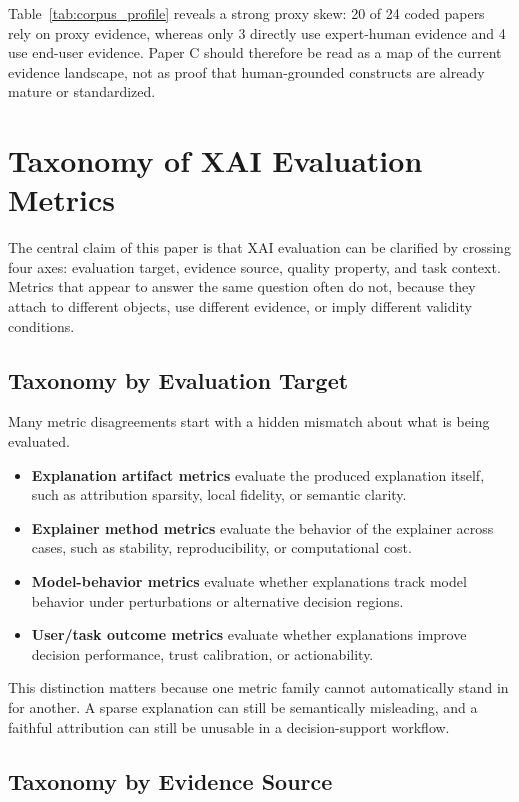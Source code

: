 \documentclass[twoside,11pt]{article}
\begin{document}
Table~\ref{tab:corpus_profile} reveals a strong proxy skew: 20 of 24
coded papers rely on proxy evidence, whereas only 3 directly use
expert-human evidence and 4 use end-user evidence. Paper C should
therefore be read as a map of the current evidence landscape, not as
proof that human-grounded constructs are already mature or standardized.

\section{Taxonomy of XAI Evaluation Metrics}

The central claim of this paper is that XAI evaluation can be clarified
by crossing four axes: evaluation target, evidence source, quality
property, and task context. Metrics that appear to answer the same
question often do not, because they attach to different objects, use
different evidence, or imply different validity conditions.

\subsection{Taxonomy by Evaluation Target}

Many metric disagreements start with a hidden mismatch about what is
being evaluated.
\begin{itemize}[leftmargin=*]
\item \textbf{Explanation artifact metrics} evaluate the produced
explanation itself, such as attribution sparsity, local fidelity, or
semantic clarity.
\item \textbf{Explainer method metrics} evaluate the behavior of the
explainer across cases, such as stability, reproducibility, or
computational cost.
\item \textbf{Model-behavior metrics} evaluate whether explanations
track model behavior under perturbations or alternative decision
regions.
\item \textbf{User/task outcome metrics} evaluate whether explanations
improve decision performance, trust calibration, or actionability.
\end{itemize}

This distinction matters because one metric family cannot automatically
stand in for another. A sparse explanation can still be semantically
misleading, and a faithful attribution can still be unusable in a
decision-support workflow.

\subsection{Taxonomy by Evidence Source}
\end{document}
